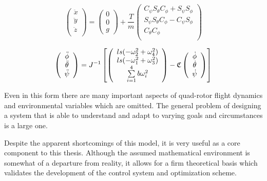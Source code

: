 \begin{equation}
    \label{lineareq}
    \left(
        \begin{array}{c}
           \ddot{x}\\
           \ddot{y}\\
           \ddot{z}\\
        \end{array}
    \right)
    = \left(
       \begin{array}{c}
        0\\
        0\\
        g
      \end{array}
    \right)
    +\frac{T}{m}
     \left(
        \begin{array}{c}
             C_{\psi}S_{\theta}C_{\phi} + S_{\psi}S_{\phi} \\
             S_{\psi}S_{\theta}C_{\phi} - C_{\psi}S_{\phi} \\
             C_{\theta} C_{\phi} \\
        \end{array}
    \right)
\end{equation}

\begin{equation}
    \label{angulareq}
    \left(
        \begin{array}{c}
           \ddot{\phi}\\
           \ddot{\theta}\\
           \ddot{\psi}\\
        \end{array}
    \right) = J^{-1}
    \left[ \left(
        \begin{array}{c}
            l s (-\omega_2^2 + \omega_4^2)\\
            l s (-\omega_1^2 + \omega_3^2)\\
            \sum \limits_{i=1}^4 b \omega_i^2\\
        \end{array}
    \right) -
    \cc
    \left(
        \begin{array}{c}
           \dot{\phi}\\
           \dot{\theta}\\
           \dot{\psi}\\
        \end{array}
    \right)
    \right]
\end{equation}


Even in this form there are many important aspects of quad-rotor flight dynamics and environmental variables which are omitted. The general problem of designing a system that is able to understand and adapt to varying goals and circumstances is a large one.

Despite the apparent shortcomings of this model, it is very useful as a core component to this thesis. Although the assumed mathematical environment is somewhat of a departure from reality, it allows for a firm theoretical basis which validates the development of the control system and optimization scheme.





